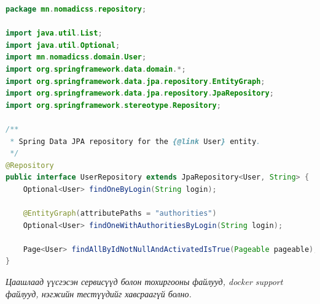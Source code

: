 \begin{lstlisting}[language=Java, caption=UserRepository.java үүсгэсэн байдал, frame=single]
package mn.nomadicss.repository;

import java.util.List;
import java.util.Optional;
import mn.nomadicss.domain.User;
import org.springframework.data.domain.*;
import org.springframework.data.jpa.repository.EntityGraph;
import org.springframework.data.jpa.repository.JpaRepository;
import org.springframework.stereotype.Repository;

/**
 * Spring Data JPA repository for the {@link User} entity.
 */
@Repository
public interface UserRepository extends JpaRepository<User, String> {
    Optional<User> findOneByLogin(String login);

    @EntityGraph(attributePaths = "authorities")
    Optional<User> findOneWithAuthoritiesByLogin(String login);

    Page<User> findAllByIdNotNullAndActivatedIsTrue(Pageable pageable);
}
\end{lstlisting}

\textit{Цаашлаад үүсгэсэн сервисүүд болон тохиргооны файлууд, docker support файлууд, нэгжийн тестүүдийг хавсраагүй болно.}